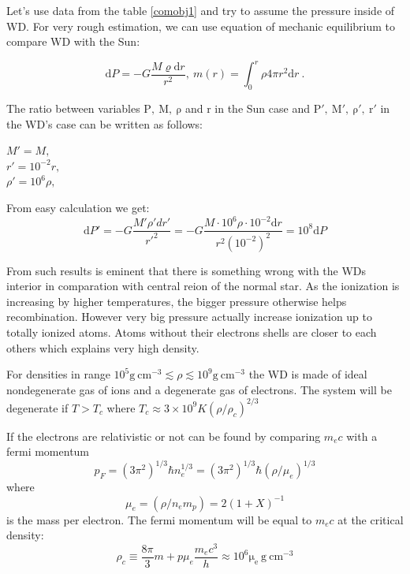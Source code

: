 \documentclass[oneside,a4paper,11pt]{report}
\begin{document}
Let's use data from the table \ref{comobj1} and try to assume the pressure inside of WD. For very 
rough estimation, we can use equation of mechanic equilibrium to compare WD with the Sun:

\begin{equation}
 \mathrm{d}P = -G\frac{M \varrho  \mathrm{d}r}{r^2},\:m(r) = \int_{0}^{r}\rho 4 \pi r^2 \mathrm{d}r \:.
\end{equation}

The ratio between variables $\mathrm{P,\: M,\: \rho}$ and $\mathrm{r}$ in the Sun case and $\mathrm{P', \:M',\: \rho',\: r'}$ in the WD's 
case can be written as follows:

\begin{center}
 $M' = M ,$  \\
 $r' = 10^{-2}r,$ \\
 $\rho' = 10^6 \rho,$ \\
\end{center}

From easy calculation we get: 
\begin{equation}
 \mathrm{d}P' = -G\frac{M' \rho' dr'}{r'^2} = -G\frac{M \cdot 10^6 \rho \cdot 10^{-2} \mathrm{d}r}{r^2 (10^{-2})^2} = 10^{8} \mathrm{d}P
\end{equation}

From such results is eminent that there is something wrong with the WDs interior in comparation with central reion of the 
normal star. As the ionization is increasing by higher temperatures, the bigger pressure otherwise helps recombination. However 
very big pressure actually increase ionization up to totally ionized atoms. Atoms without their 
electrons shells are closer to each others which explains very high density.

For densities in range $10^5 \mathrm{g\:cm^{-3}} \lesssim \rho \lesssim 10^9 \mathrm{g\:cm^{-3}}$ the WD is made 
of ideal nondegenerate gas of ions and a degenerate gas of electrons. The system will be degenerate 
if $T>T_c$ where $T_c \approx 3 \times 10^9 K (\rho / \rho_c)^{2/3} $ 

If the electrons are relativistic or not can be found by comparing $m_e c$ with a fermi momentum
\begin{equation}
 p_F = (3\pi^2)^{1/3}\hbar n_e^{1/3} = (3\pi^2)^{1/3}\hbar (\rho/\mu_e)^{1/3}
\end{equation}
 where 
\begin{equation}
 \mu_e = (\rho / n_e m_p) = 2(1+X)^{-1}
\end{equation}
is the mass per electron. The fermi momentum will be equal to $m_e c$ at the critical density:
\begin{equation}
\rho_c \equiv \frac{8\pi}{3}m+p \mu_e \frac{m_ec^3}{h} \approx 10^6 \mathrm{\mu_e\:g\:cm^{-3}}
\end{equation}
\end{document}

